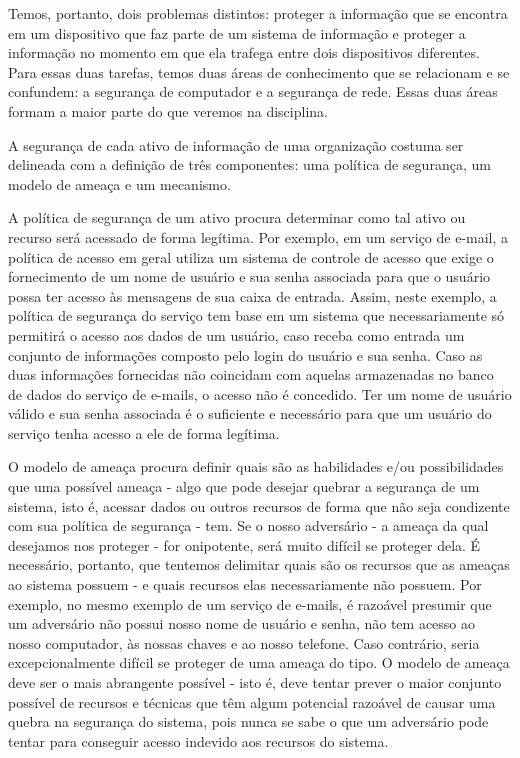 \documentclass[
	10pt,				%
	openright,			%
	twoside,			%
	a5paper,			%
	english,			%
	french,				%
	spanish,			%
	brazil,				%
	sumario=tradicional
]{abntex2}
\begin{document}
Temos, portanto, dois problemas distintos: proteger a informação que se encontra em um dispositivo que faz parte de um sistema de informação e proteger a informação no momento em que ela trafega entre dois dispositivos diferentes. Para essas duas tarefas, temos duas áreas de conhecimento que se relacionam e se confundem: a segurança de computador e a segurança de rede. Essas duas áreas formam a maior parte do que veremos na disciplina.

A segurança de cada ativo de informação de uma organização costuma ser delineada com a definição de três componentes: uma política de segurança, um modelo de ameaça e um mecanismo.

A política de segurança de um ativo procura determinar como tal ativo ou recurso será acessado de forma legítima. Por exemplo, em um serviço de e-mail, a política de acesso em geral utiliza um sistema de controle de acesso que exige o fornecimento de um nome de usuário e sua senha associada para que o usuário possa ter acesso às mensagens de sua caixa de entrada. Assim, neste exemplo, a política de segurança do serviço tem base em um sistema que necessariamente só permitirá o acesso aos dados de um usuário, caso receba como entrada um conjunto de informações composto pelo login do usuário e sua senha. Caso as duas informações fornecidas não coincidam com aquelas armazenadas no banco de dados do serviço de e-mails, o acesso não é concedido. Ter um nome de usuário válido e sua senha associada é o suficiente e necessário para que um usuário do serviço tenha acesso a ele de forma legítima.

O modelo de ameaça procura definir quais são as habilidades e/ou possibilidades que uma possível ameaça - algo que pode desejar quebrar a segurança de um sistema, isto é, acessar dados ou outros recursos de forma que não seja condizente com sua política de segurança - tem. Se o nosso adversário - a ameaça da qual desejamos nos proteger - for onipotente, será muito difícil se proteger dela. É necessário, portanto, que tentemos delimitar quais são os recursos que as ameaças ao sistema possuem - e quais recursos elas necessariamente não possuem. Por exemplo, no mesmo exemplo de um serviço de e-mails, é razoável presumir que um adversário não possui nosso nome de usuário e senha, não tem acesso ao nosso computador, às nossas chaves e ao nosso telefone. Caso contrário, seria excepcionalmente difícil se proteger de uma ameaça do tipo. O modelo de ameaça deve ser o mais abrangente possível - isto é, deve tentar prever o maior conjunto possível de recursos e técnicas que têm algum potencial razoável de causar uma quebra na segurança do sistema, pois nunca se sabe o que um adversário pode tentar para conseguir acesso indevido aos recursos do sistema.
\end{document}
